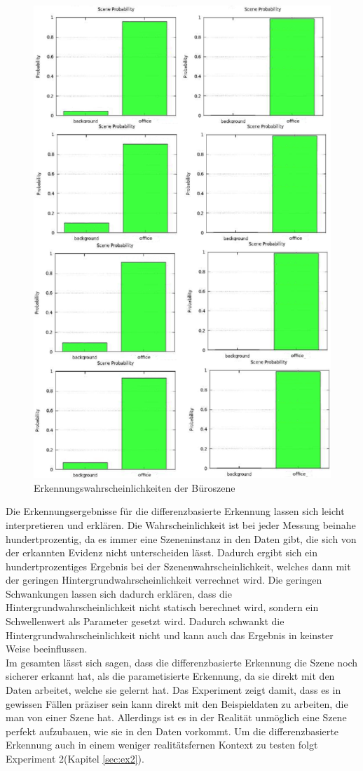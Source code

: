 \begin{figure}
	\centering
	\includegraphics[width=12cm]{bilder/buerowahrscheinlichkeit.pdf}
	\caption{Erkennungswahrscheinlichkeiten der B{\"u}roszene}
	\label{img:buerowahrscheinlichkeit}
\end{figure}
Die Erkennungsergebnisse für die differenzbasierte Erkennung lassen sich leicht interpretieren und erklären. Die Wahrscheinlichkeit ist bei jeder Messung beinahe hundertprozentig, da es immer eine Szeneninstanz in den Daten gibt, die sich von der erkannten Evidenz nicht unterscheiden lässt. Dadurch ergibt sich ein hundertprozentiges Ergebnis bei der Szenenwahrscheinlichkeit, welches dann mit der geringen Hintergrundwahrscheinlichkeit verrechnet wird. Die geringen Schwankungen lassen sich dadurch erklären, dass die Hintergrundwahrscheinlichkeit nicht statisch berechnet wird, sondern ein Schwellenwert als Parameter gesetzt wird. Dadurch schwankt die Hintergrundwahrscheinlichkeit nicht und kann auch das Ergebnis in keinster Weise beeinflussen.\smallskip\\
Im gesamten lässt sich sagen, dass die differenzbasierte Erkennung die Szene noch sicherer erkannt hat, als die parametisierte Erkennung, da sie direkt mit den Daten arbeitet, welche sie gelernt hat. Das Experiment zeigt damit, dass es in gewissen Fällen präziser sein kann direkt mit den Beispieldaten zu arbeiten, die man von einer Szene hat. Allerdings ist es in der Realität unmöglich eine Szene perfekt aufzubauen, wie sie in den Daten vorkommt. Um die differenzbasierte Erkennung auch in einem weniger realitätsfernen Kontext zu testen folgt Experiment 2(Kapitel \ref{sec:ex2}).
